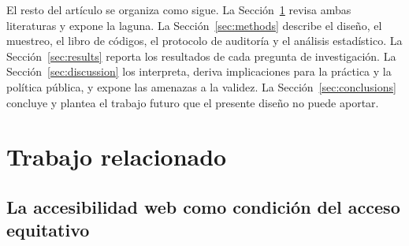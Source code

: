 \documentclass[pdflatex,sn-basic,Numbered,iicol]{sn-jnl}
\theoremstyle{thmstyleone}
\theoremstyle{thmstyletwo}
\theoremstyle{thmstylethree}
\begin{document}
El resto del art\'iculo se organiza como sigue. La Secci\'on~\ref{sec:related} revisa ambas literaturas y expone la laguna. La Secci\'on~\ref{sec:methods} describe el dise\~no, el muestreo, el libro de c\'odigos, el protocolo de auditor\'ia y el an\'alisis estad\'istico. La Secci\'on~\ref{sec:results} reporta los resultados de cada pregunta de investigaci\'on. La Secci\'on~\ref{sec:discussion} los interpreta, deriva implicaciones para la pr\'actica y la pol\'itica p\'ublica, y expone las amenazas a la validez. La Secci\'on~\ref{sec:conclusions} concluye y plantea el trabajo futuro que el presente dise\~no no puede aportar.

\section{Trabajo relacionado}\label{sec:related}

\subsection{La accesibilidad web como condici\'on del acceso equitativo}\label{sec:related-a11y}
\end{document}
